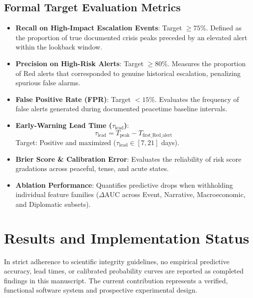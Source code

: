\documentclass[preprint,12pt]{elsarticle}
\begin{document}
\subsection{Formal Target Evaluation Metrics}
\begin{itemize}
    \item \textbf{Recall on High-Impact Escalation Events}: Target $\ge 75\%$. Defined as the proportion of true documented crisis peaks preceded by an elevated alert within the lookback window.
    \item \textbf{Precision on High-Risk Alerts}: Target $\ge 80\%$. Measures the proportion of Red alerts that corresponded to genuine historical escalation, penalizing spurious false alarms.
    \item \textbf{False Positive Rate (FPR)}: Target $< 15\%$. Evaluates the frequency of false alerts generated during documented peacetime baseline intervals.
    \item \textbf{Early-Warning Lead Time ($\tau_{\text{lead}}$)}:
    \begin{equation}
    \tau_{\text{lead}} = T_{\text{peak}} - T_{\text{first\_Red\_alert}}
    \end{equation}
    Target: Positive and maximized ($\tau_{\text{lead}} \in [7, 21]$ days).
    \item \textbf{Brier Score \& Calibration Error}: Evaluates the reliability of risk score gradations across peaceful, tense, and acute states.
    \item \textbf{Ablation Performance}: Quantifies predictive drops when withholding individual feature families ($\Delta \text{AUC}$ across Event, Narrative, Macroeconomic, and Diplomatic subsets).
\end{itemize}

\section{Results and Implementation Status}
\label{sec:results}

In strict adherence to scientific integrity guidelines, no empirical predictive accuracy, lead times, or calibrated probability curves are reported as completed findings in this manuscript. The current contribution represents a verified, functional software system and prospective experimental design.
\end{document}
